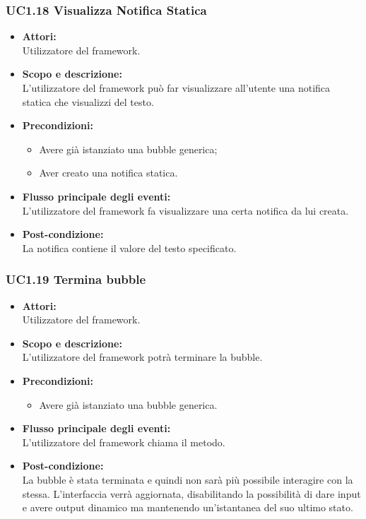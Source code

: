 \subsubsection{UC1.18 Visualizza Notifica Statica} \label{UC1.18}

\begin{itemize}
	\item \textbf{Attori:}
	\\Utilizzatore del framework.
	\item \textbf{Scopo e descrizione:} 
	\\L’utilizzatore del framework può far visualizzare all’utente una notifica statica che visualizzi del testo.
	\item \textbf{Precondizioni:}
	\begin{itemize}
		\item Avere già istanziato una bubble generica;
		\item Aver creato una notifica statica.
	\end{itemize}
	\item \textbf{Flusso principale degli eventi:}
	\\L’utilizzatore del framework fa visualizzare una certa notifica da lui creata.
	\item \textbf{Post-condizione:}
	\\La notifica contiene il valore del testo specificato.
\end{itemize}

\subsubsection{UC1.19 Termina bubble} \label{UC1.19}

\begin{itemize}
	\item \textbf{Attori:}
	\\Utilizzatore del framework.
	\item \textbf{Scopo e descrizione:} 
	\\L’utilizzatore del framework potrà terminare la bubble.
	\item \textbf{Precondizioni:}
	\begin{itemize}
		\item Avere già istanziato una bubble generica.
	\end{itemize}
	\item \textbf{Flusso principale degli eventi:}
	\\L’utilizzatore del framework chiama il metodo.
	\item \textbf{Post-condizione:}
	\\La bubble è stata terminata e quindi non sarà più possibile interagire con la stessa. L’interfaccia verrà aggiornata, disabilitando la possibilità di dare input e avere output dinamico ma mantenendo un’istantanea del suo ultimo stato.
\end{itemize}

